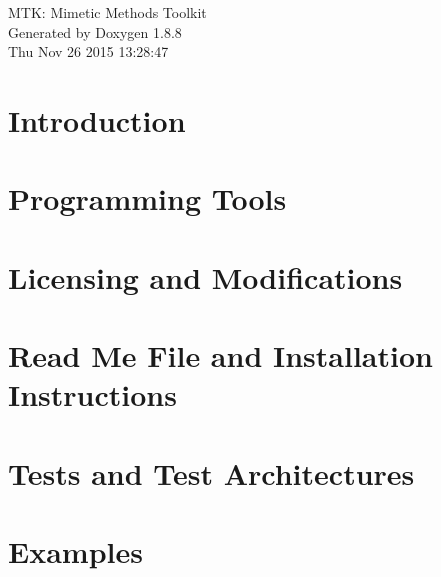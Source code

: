 \documentclass[twoside]{book}
\newcommand{\+}{\discretionary{\mbox{\scriptsize$\hookleftarrow$}}{}{}}
\newcommand{\clearemptydoublepage}{%
  \newpage{\pagestyle{empty}\cleardoublepage}%
}
\begin{document}
\hypersetup{pageanchor=false,
             bookmarks=true,
             bookmarksnumbered=true,
             pdfencoding=unicode
            }
\begin{titlepage}
\vspace*{7cm}
\begin{center}%
{\Large M\+T\+K\+: Mimetic Methods Toolkit }\\
\vspace*{1cm}
{\large Generated by Doxygen 1.8.8}\\
\vspace*{0.5cm}
{\small Thu Nov 26 2015 13:28:47}\\
\end{center}
\end{titlepage}
\clearemptydoublepage
\tableofcontents
\clearemptydoublepage
{}
\hypersetup{pageanchor=true}

\chapter{Introduction}
\label{index}\hypertarget{index}{}
\chapter{Programming Tools}
\label{section_prog_tools}
\hypertarget{section_prog_tools}{}

\chapter{Licensing and Modifications}
\label{section_license_mod}
\hypertarget{section_license_mod}{}

\chapter{Read Me File and Installation Instructions}
\label{page_readme}
\hypertarget{page_readme}{}

\chapter{Tests and Test Architectures}
\label{page_architectures}
\hypertarget{page_architectures}{}

\chapter{Examples}
\label{page_examples}
\hypertarget{page_examples}{}

\end{document}
